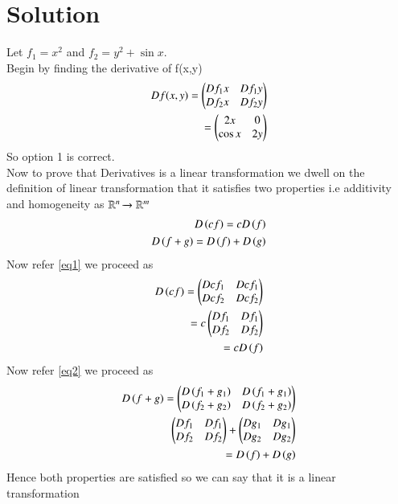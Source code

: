 \documentclass[journal,12pt,twocolumn]{IEEEtran}
\begin{document}
\section{\textbf{Solution}}
Let $f_1= x^2$ and $f_2= y^2+\sin x$.\\
Begin by finding the derivative of f(x,y)
\begin{align}
D f(x,y)=\begin{pmatrix}Df_1x& Df_1y\\Df_2x&Df_2y\end{pmatrix}\\
=\begin{pmatrix}2x&0\\\cos x&2y\end{pmatrix}
\end{align}
So option 1 is correct.\\
Now to prove that   Derivatives is a linear transformation we dwell on the definition of linear transformation that it satisfies two properties i.e additivity and homogeneity as $\mathbb{R}^n\xrightarrow{}\mathbb{R}^m$
\begin{align}
 D\left(cf\right)=cD\left(f\right)\label{eq1}\\
 D\left(f+g\right)=D\left(f\right)+D\left(g\right)\label{eq2}
\end{align}
Now refer \eqref{eq1} we proceed as
\begin{align}
 D\left(cf\right)=\begin{pmatrix}Dcf_1& Dcf_1\\Dcf_2&Dcf_2\end{pmatrix}\\
 =c\begin{pmatrix}Df_1& Df_1\\Df_2&Df_2\end{pmatrix}\\
 =cD\left(f\right)\label{eq3}
\end{align}
Now refer \eqref{eq2} we proceed as
\begin{align}
  D\left(f+g\right)=\begin{pmatrix}D\left(f_1+g_1\right)&D\left(f_1+g_1\right)\\D\left(f_2+g_2\right)&D\left(f_2+g_2\right)\end{pmatrix}\\
  \begin{pmatrix}Df_1& Df_1\\Df_2&Df_2\end{pmatrix}+\begin{pmatrix}Dg_1& Dg_1\\Dg_2&Dg_2\end{pmatrix}\\
  =D\left(f\right)+D\left(g\right)
\end{align}
Hence both properties are satisfied so we can say that it is a linear transformation
\end{document}
